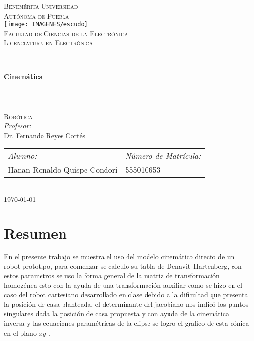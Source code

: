 \documentclass[12pt]{article}
\date{\today}
\begin{document}
\begin{titlepage}
\newcommand{\HRule}{\rule{\linewidth}{0.5mm}} 
\center
\textsc{\LARGE  Benemérita Universidad \\[0.2cm] Autónoma de Puebla}\\[1.5cm] 
\texttt{[image: IMAGENES/escudo]}\\[1cm]
\textsc{\Large Facultad de Ciencias de la Electrónica}\\[0.5cm] 
\textsc{\large Licenciatura en Electrónica}\\[0.5cm]
\HRule \\[0.4cm]
{ \huge \bfseries Cinemática}\\[0.4cm] 
\HRule \\[1.5cm]
\begin{minipage}{\textwidth}
\center 
\textsc{\LARGE Robótica}\\[1.7cm] 
\emph{Profesor:} \\
Dr. Fernando Reyes Cortés \\[1cm]
\begin{tabular}{ll}
\emph{Alumno:} & \emph{Número de Matrícula:}\\
Hanan Ronaldo Quispe Condori  & 555010653\\
\end{tabular}
\end{minipage}\\[2cm]
\today
\end{titlepage}

\newpage
\section{Resumen}
En el presente trabajo se muestra el uso del modelo cinemático directo de un robot prototipo, para comenzar se calculo su tabla de Denavit–Hartenberg, con estos parametros se uso la forma general de la matriz de transformación homogénea esto con la ayuda de una transformación auxiliar como se hizo en el caso del robot cartesiano desarrollado en clase debido a la dificultad que presenta la posición de casa planteada, el determinante del jacobiano nos indicó los puntos singulares dada la posición de casa propuesta y con ayuda de la cinemática inversa y las ecuaciones paramétricas de la elipse se logro el grafico de esta cónica en el plano $xy$ .
\newpage
\end{document}
